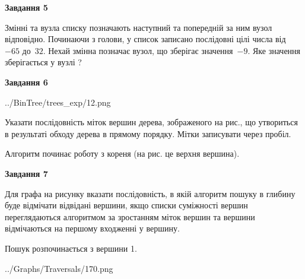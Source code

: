 \documentclass[12pt, ukrainian]{article}
\begin{document}
{\begin {large}
{\begin {center}\textbf{Завдання 5}\end {center}}\par
Змінні  та  вузла списку позначають наступний та попередній за ним вузол відповідно. Починаючи з голови, у список записано послідовні цілі числа від~$-65$ до~$32$. Нехай змінна  позначає вузол, що зберігає значення~$-9$.
Яке значення зберігається у вузлі  ?\par
\newpage

{\begin {center}\textbf{Завдання 6}\end {center}}\par

\begin{center}
	{../BinTree/trees_exp/12.png}
\end{center}
Указати послідовність міток вершин дерева, зображеного на рис., що утвориться в результаті обходу дерева в прямому порядку. Мітки записувати через пробіл.\par Алгоритм починає роботу з кореня (на рис. це верхня вершина).\par
\newpage

{\begin {center}\textbf{Завдання 7}\end {center}}\par
Для графа на рисунку вказати послідовність, в якій алгоритм пошуку в глибину буде відмічати відвідані вершини, якщо списки суміжності вершин переглядаються алгоритмом за зростанням міток вершин та вершини відмічаються на першому вход\-женні у вершину.\par
Пошук розпочинається з вершини 1.\par

\begin{center}
	{../Graphs/Traversals/170.png}
\end{center}\par
\newpage


\end{large}}
\end{document}
